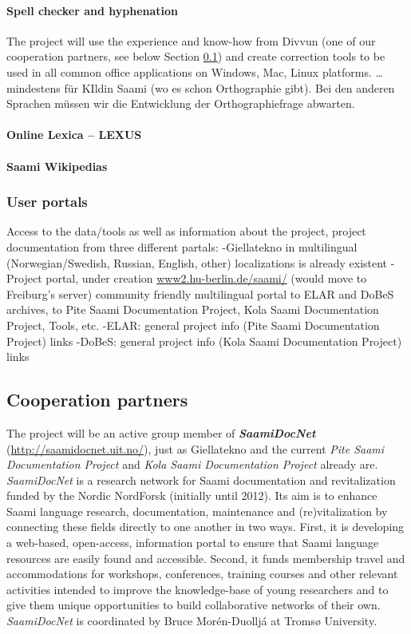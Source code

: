 \documentclass[a4paper,12pt]{article}
\begin{document}
\paragraph{Spell checker and hyphenation} 
The project will use the experience and know-how from Divvun (one of our cooperation partners, see below Section \ref{coop}) and create correction tools to be used in all common office applications on Windows, Mac, Linux platforms. … mindestens für KIldin Saami (wo es schon Orthographie gibt). Bei den anderen Sprachen müssen wir die Entwicklung der Orthographiefrage abwarten.

\paragraph{Online Lexica – LEXUS}%

\paragraph{Saami Wikipedias}%

\subsubsection{User portals}%
Access to the data/tools as well as information about the project, project documentation from three different partals:
-Giellatekno in multilingual (Norwegian/Swedish, Russian, English, other) localizations is already existent
-Project portal, under creation \url{www2.hu-berlin.de/saami/} (would move to Freiburg's server) community friendly multilingual portal to ELAR and DoBeS archives, to Pite Saami Documentation Project, Kola Saami Documentation Project, Tools, etc. 
-ELAR: general project info (Pite Saami Documentation Project) links
-DoBeS: general project info (Kola Saami Documentation Project) links

\subsection{Cooperation partners}\label{coop}%
The project will be an active group member of \textit{\textbf{SaamiDocNet}} (\url{http://saamidocnet.uit.no/}), just as Giellatekno and the current {\it Pite Saami Documentation Project} and {\it Kola Saami Documentation Project} already are. {\it SaamiDocNet} is a research network for Saami documentation and revitalization funded by the Nordic NordForsk (initially until 2012). Its aim is to enhance Saami language research, documentation, maintenance and (re)vitalization by connecting these fields directly to one another in two ways. First, it is developing a web-based, open-access, information portal to ensure that Saami language resources are easily found and accessible. Second, it funds membership travel and accommodations for workshops, conferences, training courses and other relevant activities intended to improve the knowledge-base of young researchers and to give them unique opportunities to build collaborative networks of their own. {\it SaamiDocNet} is coordinated by Bruce Morén-Duolljá at Tromsø University.
\end{document}
